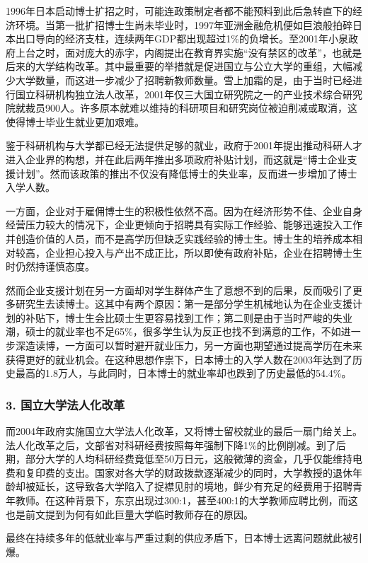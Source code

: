 {\fangsong 1996年日本启动博士扩招之时，可能连政策制定者都不能预料到此后急转直下的经济环境。当第一批扩招博士生尚未毕业时，1997年亚洲金融危机便如巨浪般拍碎日本出口导向的经济支柱，连续两年GDP都出现超过1\%的负增长。至2001年小泉政府上台之时，面对庞大的赤字，内阁提出在教育界实施“没有禁区的改革”，也就是后来的大学结构改革。其中最重要的举措就是促进国立与公立大学的重组，大幅减少大学数量，而这进一步减少了招聘新教师数量。雪上加霜的是，由于当时已经进行国立科研机构独立法人改革，2001年仅三大国立研究院之一的产业技术综合研究院就裁员900人。许多原本就难以维持的科研项目和研究岗位被迫削减或取消，这使得博士毕业生就业更加艰难。\par}

{\fangsong 鉴于科研机构与大学都已经无法提供足够的就业，政府于2001年提出推动科研人才进入企业界的构想，并在此后两年推出多项政府补贴计划，而这就是“博士企业支援计划”。然而该政策的推出不仅没有降低博士的失业率，反而进一步增加了博士入学人数。\par}

{\fangsong 一方面，企业对于雇佣博士生的积极性依然不高。因为在经济形势不佳、企业自身经营压力较大的情况下，企业更倾向于招聘具有实际工作经验、能够迅速投入工作并创造价值的人员，而不是高学历但缺乏实践经验的博士生。博士生的培养成本相对较高，企业担心投入与产出不成正比，所以即使有政府补贴，企业在招聘博士生时仍然持谨慎态度。\par}

{\fangsong 然而企业支援计划在另一方面却对学生群体产生了意想不到的后果，反而吸引了更多研究生去读博士。这其中有两个原因：第一是部分学生机械地认为在企业支援计划的补贴下，博士生会比硕士生更容易找到工作；第二则是由于当时严峻的失业潮，硕士的就业率也不足65\%，很多学生认为反正也找不到满意的工作，不如进一步深造读博，一方面可以暂时避开就业压力，另一方面也期望通过提高学历在未来获得更好的就业机会。在这种思想作祟下，日本博士的入学人数在2003年达到了历史最高的1.8万人，与此同时，日本博士的就业率却也跌到了历史最低的54.4\%。\par}

\subsubsection{3. 国立大学法人化改革}

{\fangsong 而2004年政府实施国立大学法人化改革，又将博士留校就业的最后一扇门给关上。法人化改革之后，文部省对科研经费按照每年强制下降1\%的比例削减。到了后期，部分大学的人均科研经费竟低至50万日元，这般微薄的资金，几乎仅能维持电费和复印费的支出。国家对各大学的财政拨款逐渐减少的同时，大学教授的退休年龄却被延长，这导致各大学陷入了捉襟见肘的境地，鲜少有充足的经费用于招聘青年教师。在这种背景下，东京出现过300:1，甚至400:1的大学教师应聘比例，而这也是前文提到为何有如此巨量大学临时教师存在的原因。\par}

{\fangsong 最终在持续多年的低就业率与严重过剩的供应矛盾下，日本博士远离问题就此被引爆。\par}




